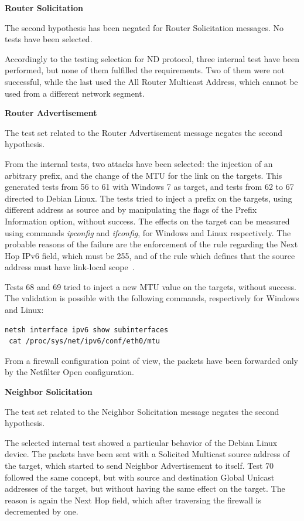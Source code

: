 \documentclass[12pt]{article}
\begin{document}
\textbf{Router Solicitation}


The second hypothesis has been negated for Router Solicitation messages. No tests have been selected. 

Accordingly to the testing selection for ND protocol, three internal test have been performed, but none of them fulfilled the requirements. Two of them were not successful, while the last used the All Router Multicast Address, which cannot be used from a different network segment.

\textbf{Router Advertisement}

The test set related to the Router Advertisement message negates the second hypothesis.

From the internal tests, two attacks have been selected: the injection of an arbitrary prefix, and the change of the MTU for the link on the targets. This generated tests from 56 to 61 with Windows 7 as target, and tests from 62 to 67 directed to Debian Linux. The tests tried to inject a prefix on the targets, using different address as source and by manipulating the flags of the Prefix Information option, without success. The effects on the target can be measured using commands \textit{ipconfig} and \textit{ifconfig}, for Windows and Linux respectively. The probable reasons of the failure are the enforcement of the rule regarding the Next Hop IPv6 field, which must be 255, and of the rule which defines that the source address must have link-local scope~\cite{rfc4861}.

Tests 68 and 69 tried to inject a new MTU value on the targets, without success. The validation is possible with the following commands, respectively for Windows and Linux:
\begin{lstlisting}[style=python,basicstyle=\ttfamily\small]
 netsh interface ipv6 show subinterfaces
 cat /proc/sys/net/ipv6/conf/eth0/mtu
\end{lstlisting}
\vspace{-15pt}
From a firewall configuration point of view, the packets have been forwarded only by the Netfilter Open configuration.

\textbf{Neighbor Solicitation}

The test set related to the Neighbor Solicitation message negates the second hypothesis.

The selected internal test showed a particular behavior of the Debian Linux device. The packets have been sent with a Solicited Multicast source address of the target, which started to send Neighbor Advertisement to itself. Test 70 followed the same concept, but with source and destination Global Unicast addresses of the target, but without having the same effect on the target. The reason is again the Next Hop field, which after traversing the firewall is decremented by one.
\end{document}
